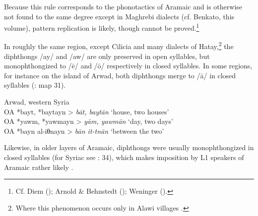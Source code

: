 \documentclass[output=paper]{langsci/langscibook}
\begin{document}
Because this rule corresponds to the phonotactics of Aramaic and is otherwise not found to the same degree except in Maghrebi dialects (cf. Benkato, this volume), pattern replication is likely, though cannot be proved.\footnote{Cf. Diem (\citeyear[47]{Diem1979}); Arnold \& Behnstedt (\citeyear[69--71]{ArnoldBehnstedt1993}); Weninger (\citeyear[748]{Weninger2011Aramaic}).}

In roughly the same region, except Cilicia and many dialects of Hatay,\footnote{Where this phenomenon occurs only in Alawi villages \citep[84]{Arnold1998}.} the diphthongs /ay/ and /aw/ are only preserved in open syllables, but monophthongized to /ē/ and /ō/ respectively in closed syllables. In some regions, for instance on the island of Arwad, both diphthongs merge to /ā/ in closed syllables (\citealt{Behnstedt1997}: map 31). 

\ea 
{Arwad, western Syria \citep[278]{Procházka2013}} \\
    \textup{OA} *bayt, *baytayn > \textit{bāt, baytān} \textup{‘house, two houses’\\
OA} *yawm, *yawmayn >  \textit{yām, yawmān} \textup{‘day, two days’\\
OA} *bayn al-iθnayn > \textit{bān it-tnān} \textup{‘}\textup{between the two’}\\
\z

Likewise, in older layers of Aramaic, diphthongs were usually monophthongized in closed syllables (for Syriac see \citealt{Nöldeke1904Semitic}: 34), which makes imposition by L1 speakers of Aramaic rather likely \citep[227]{Fleisch1974Kfar}.
\end{document}
